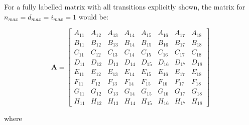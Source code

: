 \documentclass{article}
\begin{document}
\begin{flushleft}
For a fully labelled matrix with all transitions explicitly shown, the matrix for $n_{max} = d_{max} = i_{max} = 1$ would be:

\[
\mathbf{A} = 
\begin{bmatrix}
A_{11} & A_{12} & A_{13} & A_{14} & A_{15} & A_{16} & A_{17} & A_{18} \\
B_{11} & B_{12} & B_{13} & B_{14} & B_{15} & B_{16} & B_{17} & B_{18} \\
C_{11} & C_{12} & C_{13} & C_{14} & C_{15} & C_{16} & C_{17} & C_{18} \\
D_{11} & D_{12} & D_{13} & D_{14} & D_{15} & D_{16} & D_{17} & D_{18} \\
E_{11} & E_{12} & E_{13} & E_{14} & E_{15} & E_{16} & E_{17} & E_{18} \\
F_{11} & F_{12} & F_{13} & F_{14} & F_{15} & F_{16} & F_{17} & F_{18} \\
G_{11} & G_{12} & G_{13} & G_{14} & G_{15} & G_{16} & G_{17} & G_{18} \\
H_{11} & H_{12} & H_{13} & H_{14} & H_{15} & H_{16} & H_{17} & H_{18}
\end{bmatrix}
\]

where  


\end{flushleft}
\end{document}
